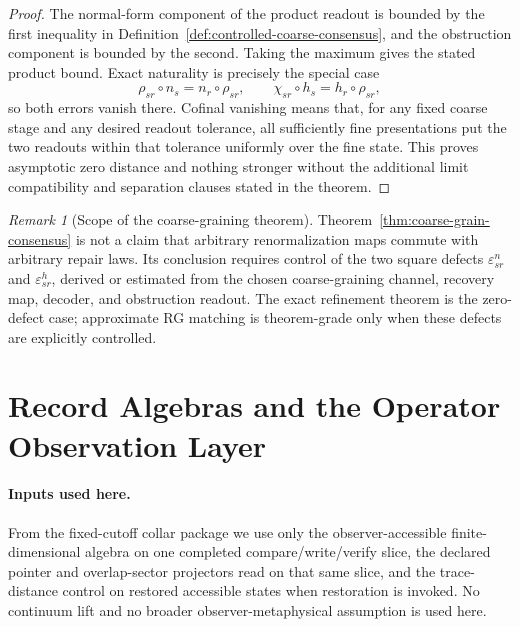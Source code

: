 \documentclass[11pt]{article}
\theoremstyle{remark}
\newtheorem{remark}[theorem]{Remark}
\theoremstyle{plain}
\begin{document}
\begin{proof}
The normal-form component of the product readout is bounded by the first inequality in
Definition~\ref{def:controlled-coarse-consensus}, and the obstruction component is bounded by the
second. Taking the maximum gives the stated product bound. Exact naturality is precisely the
special case
\[
\rho_{sr}\circ n_s=n_r\circ\rho_{sr},
\qquad
\chi_{sr}\circ h_s=h_r\circ\rho_{sr},
\]
so both errors vanish there. Cofinal vanishing means that, for any fixed coarse stage and any
desired readout tolerance, all sufficiently fine presentations put the two readouts within that
tolerance uniformly over the fine state. This proves asymptotic zero distance and nothing stronger
without the additional limit compatibility and separation clauses stated in the theorem.
\end{proof}

\begin{remark}[Scope of the coarse-graining theorem]\label{rem:coarse-grain-scope}
Theorem~\ref{thm:coarse-grain-consensus} is not a claim that arbitrary renormalization maps
commute with arbitrary repair laws. Its conclusion requires control of the
two square defects \(\varepsilon^n_{sr}\) and \(\varepsilon^h_{sr}\), derived or estimated from the chosen
coarse-graining channel, recovery map, decoder, and obstruction readout. The exact refinement
theorem is the zero-defect case; approximate RG matching is theorem-grade only when these defects
are explicitly controlled.
\end{remark}


\section{Record Algebras and the Operator Observation Layer}

\paragraph{Inputs used here.}
From the fixed-cutoff collar package we use only the observer-accessible finite-dimensional algebra
on one completed compare/write/verify slice, the declared pointer and overlap-sector projectors
read on that same slice, and the trace-distance control on restored accessible states when
restoration is invoked. No continuum lift and no broader observer-metaphysical assumption is used
here.
\end{document}
